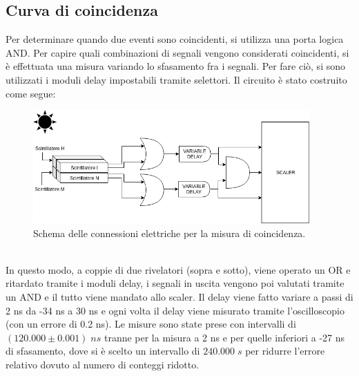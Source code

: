 \documentclass[11pt]{article} %
\begin{document}
\subsection{Curva di coincidenza}
Per determinare quando due eventi sono coincidenti, si utilizza una porta logica AND. Per capire quali combinazioni di segnali vengono considerati coincidenti, si è effettuata una misura variando lo sfasamento fra i segnali. Per fare ciò, si sono utilizzati i moduli delay impostabili tramite selettori. Il circuito è stato costruito come segue:
\begin{figure}[h!]
\begin{center}
\includegraphics[width=400px]{img/conn_4.png}
\caption{Schema delle connessioni elettriche per la misura di coincidenza.}
\label{fig:con_4}
\end{center}
\end{figure}\\
In questo modo, a coppie di due rivelatori (sopra e sotto), viene operato un OR e ritardato tramite i moduli delay, i segnali in uscita vengono poi valutati tramite un AND e il tutto viene mandato allo scaler. Il delay viene fatto variare a passi di 2 ns da -34 ns a 30 ns e ogni volta il delay viene misurato tramite l'oscilloscopio (con un errore di 0.2 ns). Le misure sono state prese con intervalli di $\left(120.000\pm 0.001\right)\; ns$ tranne per la misura a 2 ns e per quelle inferiori a -27 ns di sfasamento, dove si è scelto un intervallo di $240.000\;s$ per ridurre l'errore relativo dovuto al numero di conteggi ridotto. 
\newpage
\end{document}
